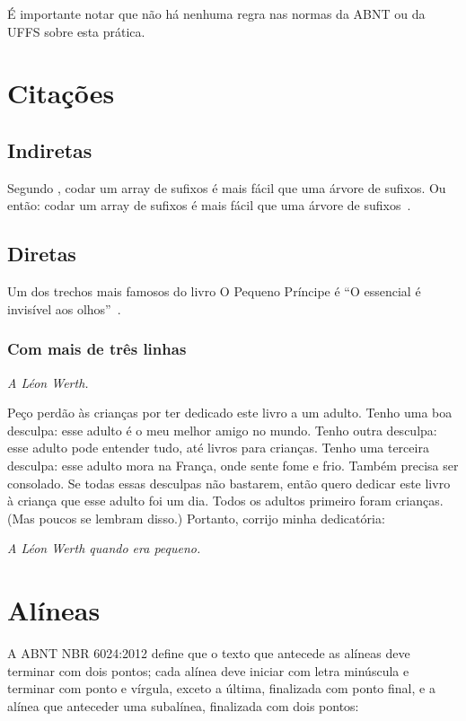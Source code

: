 \documentclass[serif, brazilian]{uffstex}
\begin{document}
É importante notar que não há nenhuma regra nas normas da ABNT ou da UFFS
sobre esta prática.

\chapter{Citações}

\section{Indiretas}

Segundo \textcite{halim3rd}, codar um array de sufixos é mais fácil que uma árvore de sufixos. Ou então: codar um array de sufixos é mais fácil que uma árvore de sufixos~\cite[253]{halim3rd}.

\section{Diretas}

Um dos trechos mais famosos do livro O Pequeno Príncipe é \enquote{O essencial é invisível aos olhos}~\cite[58]{exupery15}.

\subsection{Com mais de três linhas}

\begin{citacao}
\textit{A Léon Werth.}

Peço perdão às crianças por ter dedicado este livro a um adulto. Tenho uma boa desculpa: esse adulto é o meu melhor amigo no mundo. Tenho outra desculpa: esse adulto pode entender tudo, até livros para crianças. Tenho uma terceira desculpa: esse adulto mora na França, onde sente fome e frio. Também precisa ser consolado. Se todas essas desculpas não bastarem, então quero dedicar este livro à criança que esse adulto foi um dia. Todos os adultos primeiro foram crianças. (Mas poucos se lembram disso.) Portanto, corrijo minha dedicatória:

\textit{A Léon Werth quando era pequeno.}~\cite{exupery15}
\end{citacao}

\chapter{Alíneas}

A ABNT NBR 6024:2012 define que o texto que antecede as alíneas deve terminar com dois pontos; cada alínea deve iniciar com letra minúscula e terminar com ponto e vírgula, exceto a última, finalizada com ponto final, e a alínea que anteceder uma subalínea, finalizada com dois pontos:
\end{document}
